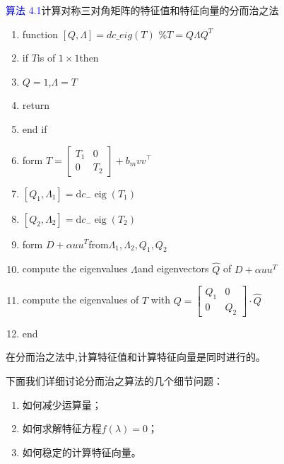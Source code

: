 \documentclass[notheorems,serif]{beamer}
\begin{document}
\begin{frame}
\textcolor{blue}{算法 4.1}\quad 计算对称三对角矩阵的特征值和特征向量的分而治之法
\begin{enumerate}[1:]
	\item function $[Q,\Lambda]=dc\_eig(T)$  \quad $\%T=Q\Lambda Q^T$
	\item if $T$is of $1\times 1$then
	\item \quad $Q=1$,$\Lambda=T$
	\item \quad return
	\item end if
	\item form $T=\left[\begin{array}{cc}{T_{1}} & {0} \\ {0} & {T_{2}}\end{array}\right]+b_{m} v v^{\top}
	$
	\item $\left[Q_{1}, \Lambda_{1}\right]=\mathrm{d} c_{-} \operatorname{eig}\left(T_{1}\right)$
	\item $\left[Q_{2}, \Lambda_{2}\right]=\mathrm{d} c_{-} \operatorname{eig}\left(T_{2}\right)$
	\item form $D+\alpha uu^T$from$\Lambda_{1},\Lambda_{2},Q_1,Q_2$
	\item compute the eigenvalues $\Lambda$and eigenvectors  $\hat{Q}$ of $D+\alpha uu^T$
	\item compute the eigenvalues of $T$ with $Q=\left[\begin{array}{cc}{Q_{1}} & {0} \\ {0} & {Q_{2}}\end{array}\right] \cdot \hat{Q}$
	\item end
\end{enumerate}
\end{frame}
\begin{frame}
在分而治之法中,计算特征值和计算特征向量是同时进行的。
\end{frame}
\begin{frame}
下面我们详细讨论分而治之算法的几个细节问题：
\begin{enumerate}[(1)]
	\item 如何减少运算量；
	\item 如何求解特征方程$f(\lambda)=0$；
	\item 如何稳定的计算特征向量。
\end{enumerate}
\end{frame}
\end{document}
